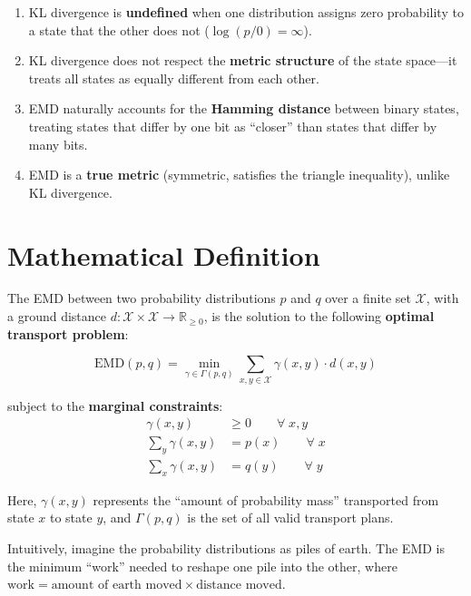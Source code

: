 \documentclass[11pt,a4paper]{report}
\newcommand{\EMD}{\mathrm{EMD}}
\begin{document}
\begin{enumerate}[leftmargin=2em]
  \item KL divergence is \textbf{undefined} when one distribution assigns zero probability to a state that the other does not ($\log(p/0) = \infty$).
  \item KL divergence does not respect the \textbf{metric structure} of the state space---it treats all states as equally different from each other.
  \item EMD naturally accounts for the \textbf{Hamming distance} between binary states, treating states that differ by one bit as ``closer'' than states that differ by many bits.
  \item EMD is a \textbf{true metric} (symmetric, satisfies the triangle inequality), unlike KL divergence.
\end{enumerate}

\section{Mathematical Definition}

The EMD between two probability distributions $p$ and $q$ over a finite set $\mathcal{X}$, with a ground distance $d : \mathcal{X} \times \mathcal{X} \to \mathbb{R}_{\geq 0}$, is the solution to the following \textbf{optimal transport problem}:

\begin{mathbox}
\vspace{-8pt}
\[
  \EMD(p, q) = \min_{\gamma \in \Gamma(p,q)} \sum_{x, y \in \mathcal{X}} \gamma(x, y) \cdot d(x, y)
\]
\vspace{-10pt}
\end{mathbox}

subject to the \textbf{marginal constraints}:
\begin{align}
  \gamma(x, y) &\geq 0 \qquad \forall\; x, y \\
  \sum_{y} \gamma(x, y) &= p(x) \qquad \forall\; x \\
  \sum_{x} \gamma(x, y) &= q(y) \qquad \forall\; y
\end{align}

Here, $\gamma(x, y)$ represents the ``amount of probability mass'' transported from state $x$ to state $y$, and $\Gamma(p, q)$ is the set of all valid transport plans.

Intuitively, imagine the probability distributions as piles of earth. The EMD is the minimum ``work'' needed to reshape one pile into the other, where $\text{work} = \text{amount of earth moved} \times \text{distance moved}$.
\end{document}

